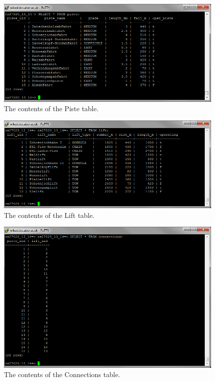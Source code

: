 \documentclass[11pt]{scrartcl} %
\begin{document}
\begin{figure}[H]
  \centering
    \includegraphics[width=1\textwidth]{IMG/content_piste.png}
 \caption{The contents of the Piste table.}
\end{figure}
\begin{figure}[H]
  \centering
    \includegraphics[width=1\textwidth]{IMG/content_lift.png}
 \caption{The contents of the Lift table.}
\end{figure}
\begin{figure}[H]
  \centering
    \includegraphics[width=1\textwidth]{IMG/content_connections.png}
 \caption{The contents of the Connections table.}
\end{figure}
\end{document}
